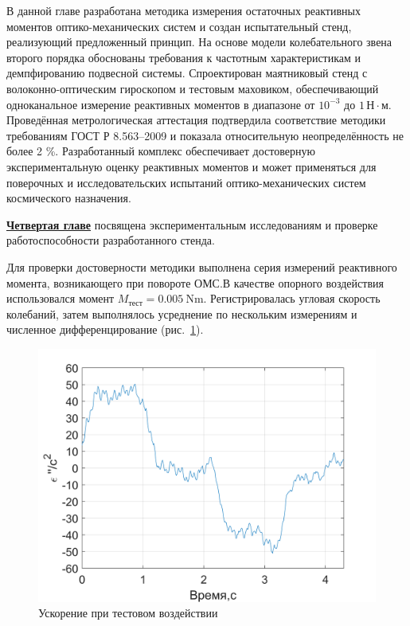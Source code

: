 В данной главе разработана методика измерения остаточных реактивных моментов оптико-механических систем и создан испытательный стенд, реализующий предложенный принцип.
На основе модели колебательного звена второго порядка обоснованы требования к частотным характеристикам и демпфированию подвесной системы.
Спроектирован маятниковый стенд с волоконно-оптическим гироскопом и тестовым маховиком, обеспечивающий одноканальное измерение реактивных моментов в диапазоне от $10^{-3}$ до $1\,\text{Н}\cdot\text{м}$. Проведённая метрологическая аттестация подтвердила соответствие методики требованиям ГОСТ Р 8.563–2009 и показала относительную неопределённость не более 2 \%. Разработанный комплекс обеспечивает достоверную экспериментальную оценку реактивных моментов и может применяться для поверочных и исследовательских испытаний оптико-механических систем космического назначения.

\underline{\textbf{Четвертая главе}} посвящена экспериментальным исследованиям и проверке работоспособности разработанного стенда.

Для проверки достоверности методики выполнена серия измерений реактивного момента, возникающего при повороте ОМС.В качестве опорного воздействия использовался момент $M_{\text{тест}}=\SI{0.005}{\newton\meter}$. Регистрировалась угловая скорость колебаний, затем выполнялось усреднение по нескольким измерениям и численное дифференцирование (рис.~\cref{fig:test-gyro-acc}).

\begin{figure}[h!]
	\centering
	\includegraphics[scale=0.45]{matlab/img/test-gyro-acc}
	\caption{Ускорение при тестовом воздействии}
	\label{fig:test-gyro-acc}
\end{figure}

